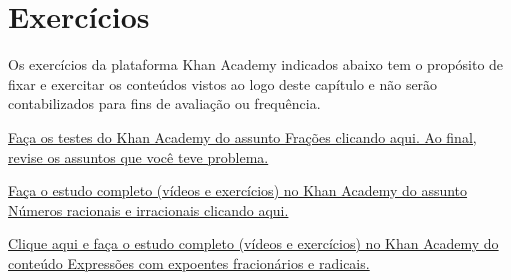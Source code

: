 \section{Exercícios}

Os exercícios da plataforma Khan Academy indicados abaixo tem o propósito de fixar e exercitar os conteúdos vistos ao logo deste capítulo e não serão contabilizados para fins de avaliação ou frequência.

\begin{exercise}
    \href{https://pt.khanacademy.org/math/arithmetic-home/arith-review-fractions/test/practice-test?modal=1}{Faça os testes do Khan Academy do assunto Frações clicando aqui. Ao final, revise os assuntos que você teve problema.}
\end{exercise}

\begin{exercise}
     \href{https://pt.khanacademy.org/math/algebra/rational-and-irrational-numbers}{Faça o estudo completo (vídeos e exercícios) no Khan Academy do  assunto Números racionais e irracionais clicando aqui.}
\end{exercise}

\begin{exercise}
    \href{https://pt.khanacademy.org/math/algebra/rational-exponents-and-radicals}{Clique aqui e faça o estudo completo (vídeos e exercícios) no Khan Academy do conteúdo Expressões com expoentes fracionários e radicais.}
\end{exercise}
